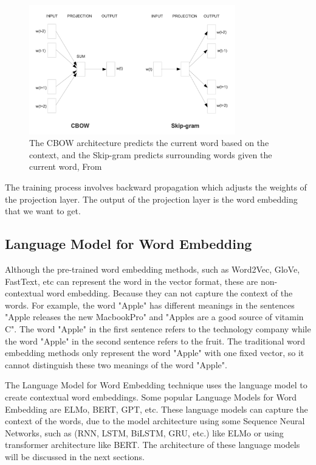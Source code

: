 \begin{figure}[ht]
    \centering
    \includegraphics[width=0.8\textwidth]{Images/5.Theoretical_Background/cbow_vs_skipgram.png}
    \caption{The CBOW architecture predicts the current word based on the context, and the Skip-gram predicts surrounding words given the current word, From \cite{word2vec-paper-publication}}
    \label{fig:cbow_vs_skipgram}
\end{figure}

The training process involves backward propagation which adjusts the weights of the projection layer. The output of the projection layer is the word embedding that we want to get.

\subsection{Language Model for Word Embedding}
Although the pre-trained word embedding methods, such as Word2Vec, GloVe, FastText, etc can represent the word in the vector format, these are non-contextual word embedding. Because they can not capture the context of the words. For example, the word "Apple" has different meanings in the sentences "Apple releases the new MacbookPro" and "Apples are a good source of vitamin C". The word "Apple" in the first sentence refers to the technology company while the word "Apple" in the second sentence refers to the fruit. The traditional word embedding methods only represent the word "Apple" with one fixed vector, so it cannot distinguish these two meanings of the word "Apple".

The Language Model for Word Embedding technique uses the language model to create contextual word embeddings. Some popular Language Models for Word Embedding are ELMo, BERT, GPT, etc. These language models can capture the context of the words, due to the model architecture using some Sequence Neural Networks, such as (RNN, LSTM, BiLSTM, GRU, etc.) like ELMo or using transformer architecture like BERT. The architecture of these language models will be discussed in the next sections.

